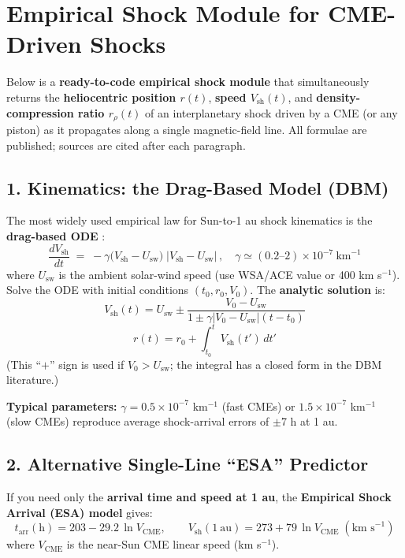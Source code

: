 

\section*{Empirical Shock Module for CME-Driven Shocks}

Below is a \textbf{ready-to-code empirical shock module} that simultaneously returns the \textbf{heliocentric position $r(t)$}, \textbf{speed $V_{\text{sh}}(t)$}, and \textbf{density-compression ratio $r_{\rho}(t)$} of an interplanetary shock driven by a CME (or any piston) as it propagates along a single magnetic-field line. All formulae are published; sources are cited after each paragraph.

\subsection*{1. Kinematics: the Drag-Based Model (DBM)}

The most widely used empirical law for Sun-to-1 au shock kinematics is the \textbf{drag-based ODE} \cite{Vrsnak2007}:
\[
\boxed{\;
\frac{dV_{\text{sh}}}{dt}\;=\;-\gamma\bigl(V_{\text{sh}}-U_{\text{sw}}\bigr)
\;\bigl|V_{\text{sh}}-U_{\text{sw}}\bigr|\,,
\quad
\gamma\simeq(0.2\text{--}2)\times10^{-7}\ \text{km}^{-1}\;}
\]
where $U_{\text{sw}}$ is the ambient solar-wind speed (use WSA/ACE value or 400 km s$^{-1}$). Solve the ODE with initial conditions $(t_0, r_0, V_0)$. The \textbf{analytic solution} is:
\[
V_{\text{sh}}(t) = U_{\text{sw}} \pm \frac{V_0 - U_{\text{sw}}}{1 \pm \gamma |V_0 - U_{\text{sw}}| (t - t_0)}
\]
\[
r(t) = r_0 + \int_{t_0}^{t} V_{\text{sh}}(t')\,dt'
\]
(This ``$+$'' sign is used if $V_0 > U_{\text{sw}}$; the integral has a closed form in the DBM literature.)

\textbf{Typical parameters:} $\gamma = 0.5{\times}10^{-7}$ km$^{-1}$ (fast CMEs) or $1.5{\times}10^{-7}$ km$^{-1}$ (slow CMEs) reproduce average shock-arrival errors of $\pm$7 h at 1 au.

\subsection*{2. Alternative Single-Line ``ESA'' Predictor}

If you need only the \textbf{arrival time and speed at 1 au}, the \textbf{Empirical Shock Arrival (ESA) model} gives:
\[
t_{\mathrm{arr}}(\text{h}) = 203 - 29.2\,\ln V_{\text{CME}},
\qquad
V_{\text{sh}}(1\ \mathrm{au}) = 273 + 79\,\ln V_{\text{CME}} \; (\text{km s}^{-1})
\]
where $V_{\text{CME}}$ is the near-Sun CME linear speed (km s$^{-1}$).

